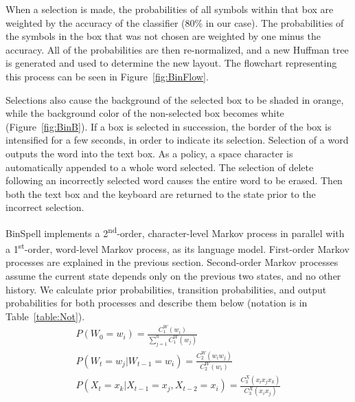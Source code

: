 \documentclass[12pt,titlepage]{article}
\begin{document}
When a selection is made, the probabilities of all symbols within that box are weighted by the accuracy 
of the classifier (80\% in our case).  The probabilities of the symbols in the box that was not chosen are 
weighted by one minus the accuracy.  All of the probabilities are then re-normalized, and a new 
Huffman tree is generated and used to determine the new layout.  The flowchart representing this 
process can be seen in Figure~\ref{fig:BinFlow}.

Selections also cause the background of the selected box to be shaded in orange, while the background 
color of the non-selected box becomes white (Figure~\ref{fig:BinB}).  If a box is selected in succession, the border of the 
box is intensified for a few seconds, in order to indicate its selection.  Selection of a word outputs the 
word into the text box.  As a policy, a space character is automatically appended to a whole word 
selected.  The selection of delete following an incorrectly selected word causes the entire word to be 
erased.  Then both the text box and the keyboard are returned to the state prior to the incorrect 
selection.

BinSpell implements a 2\textsuperscript{nd}-order, character-level Markov process in parallel with a 1\textsuperscript{st}-order, word-level 
Markov process, as its language model.  First-order Markov processes are explained in the previous 
section.  Second-order Markov processes assume the current state depends only on the previous two 
states, and no other history.  We calculate prior probabilities, transition probabilities, and output 
probabilities for both processes and describe them below (notation is in Table~\ref{table:Not}).
\begin{gather*}
P(W_0 = w_i) = \frac{C_1^W(w_i)}{\displaystyle \sum_{j=1}^n C_1^W(w_j)} \tag{4} \\
P(W_t = w_j | W_{t-1} = w_i) = \frac{C_2^W(w_i w_j)}{\displaystyle C_2^W(w_i)} \tag{5} \\
P(X_t = x_k | X_{t-1} = x_j, X_{t-2} = x_i) = \frac{C_3^X(x_i x_j x_k)}{\displaystyle C_3^X(x_i x_j)} \tag{6}
\end{gather*}
\end{document}
